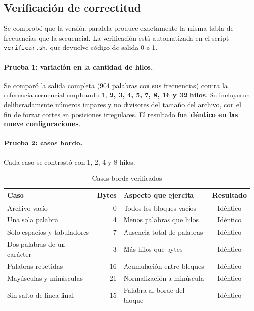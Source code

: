 \documentclass[11pt,letterpaper]{article}
\begin{document}
\subsection{Verificación de correctitud}
\label{sec:correctitud}

Se comprobó que la versión paralela produce exactamente la misma tabla de
frecuencias que la secuencial. La verificación está automatizada en el script
\texttt{verificar.sh}, que devuelve código de salida 0 o 1.

\paragraph{Prueba 1: variación en la cantidad de hilos.}
Se comparó la salida completa (904 palabras con sus frecuencias) contra la
referencia secuencial empleando \textbf{1, 2, 3, 4, 5, 7, 8, 16 y 32 hilos}. Se
incluyeron deliberadamente números impares y no divisores del tamaño del archivo,
con el fin de forzar cortes en posiciones irregulares. El resultado fue
\textbf{idéntico en las nueve configuraciones}.

\paragraph{Prueba 2: casos borde.}
Cada caso se contrastó con 1, 2, 4 y 8 hilos.

\begin{table}[H]
\centering
\caption{Casos borde verificados}
\small
\begin{tabular}{@{}p{4.4cm}R p{5.6cm}c@{}}
\toprule
\textbf{Caso} & \textbf{Bytes} & \textbf{Aspecto que ejercita} &
\textbf{Resultado} \\
\midrule
Archivo vacío & 0 & Todos los bloques vacíos & Idéntico \\
Una sola palabra & 4 & Menos palabras que hilos & Idéntico \\
Solo espacios y tabuladores & 7 & Ausencia total de palabras & Idéntico \\
Dos palabras de un carácter & 3 & Más hilos que bytes & Idéntico \\
Palabras repetidas & 16 & Acumulación entre bloques & Idéntico \\
Mayúsculas y minúsculas & 21 & Normalización a minúscula & Idéntico \\
Sin salto de línea final & 15 & Palabra al borde del bloque & Idéntico \\
\bottomrule
\end{tabular}
\end{table}
\end{document}
